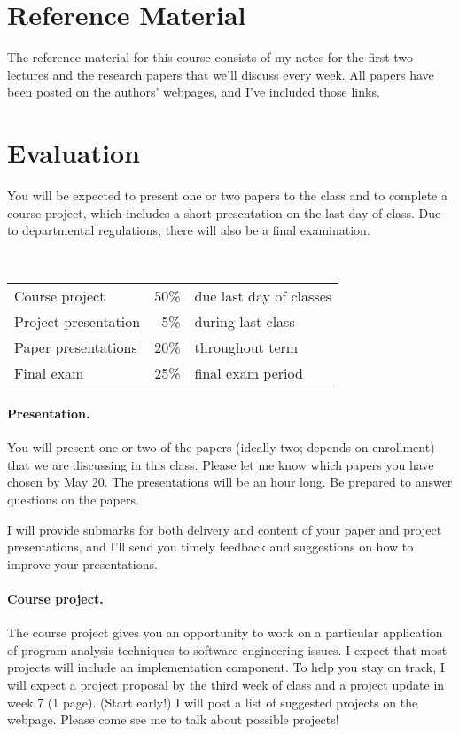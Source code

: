 \documentclass{article}
\begin{document}
\section*{Reference Material}
The reference material for this course consists of my notes for the first
two lectures and the research papers that we'll discuss every week. All
papers have been posted on the authors' webpages, and I've included those links.


\section*{Evaluation}
You will be expected to present one or two papers to the class and to
complete a course project, which includes a short presentation on the
last day of class. Due to departmental regulations, there will also be
a final examination.

~\\

\begin{tabular}{lrl}
Course project & 50\% & due last day of classes \\
Project presentation & 5\% & during last class \\
Paper presentations & 20\% & throughout term \\
Final exam & 25\% & final exam period
\end{tabular}

\paragraph{Presentation.} You will present one or two of the papers (ideally two;
depends on enrollment) that we are discussing in this class. Please
let me know which papers you have chosen by May 20. The presentations
will be an hour long.  Be prepared to answer questions on the papers.

I will provide submarks for both delivery and content of your paper
and project presentations, and I'll send you timely feedback and
suggestions on how to improve your presentations. 

\paragraph{Course project.} The course project gives you an opportunity to
work on a particular application of program analysis techniques to
software engineering issues. I expect that most projects will include
an implementation component. To help you stay on track, I will expect
a project proposal by the third week of class and a project
update in week 7 (1 page). (Start early!) I will post a list of suggested
projects on the webpage. Please come see me to talk about possible
projects!
\end{document}
